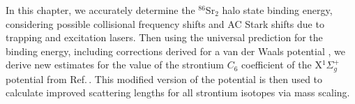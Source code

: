 In this chapter, we accurately determine the $^{86}$Sr$_2$ halo state binding energy, considering possible collisional frequency shifts and AC Stark shifts due to trapping and excitation lasers.
Then using the universal prediction for the binding energy, including corrections derived for a van der Waals potential \cite{gfl93,Gao01,gao04}, we derive new estimates for the value of the strontium $C_6$ coefficient of the X$^1\Sigma_g^+$ potential from Ref.\,\cite{Stein2010}.
This modified version of the potential is then used to calculate improved scattering lengths for all strontium isotopes via mass scaling.


